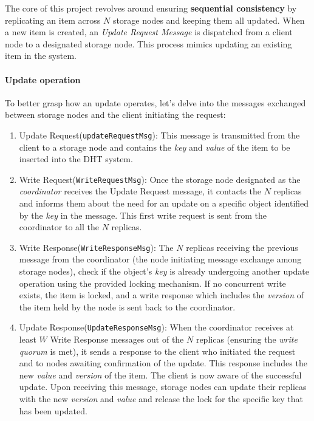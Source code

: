 \documentclass[a4paper, 11pt]{article}
\begin{document}
The core of this project revolves around ensuring \textbf{sequential consistency} by replicating an item across $N$ storage nodes and keeping them all updated. When a new item is created, an \textit{Update Request Message} is dispatched from a client node to a designated storage node. This process mimics updating an existing item in the system.

\paragraph{Update operation} To better grasp how an update operates, let's delve into the messages exchanged between storage nodes and the client initiating the request:

\begin{enumerate}
    \item Update Request(\verb|updateRequestMsg|): This message is transmitted from the client to a storage node and contains the \textit{key} and \textit{value} of the item to be inserted into the DHT system.

    \item Write Request(\verb|WriteRequestMsg|): Once the storage node designated as the \textit{coordinator} receives the Update Request message, it contacts the $N$ replicas and informs them about the need for an update on a specific object identified by the \textit{key} in the message. This first write request is sent from the coordinator to all the $N$ replicas.

    \item Write Response(\verb|WriteResponseMsg|): The $N$ replicas receiving the previous message from the coordinator (the node initiating message exchange among storage nodes), check if the object's \textit{key} is already undergoing another update operation using the provided locking mechanism. If no concurrent write exists, the item is locked, and a write response which includes the \textit{version} of the item held by the node is sent back to the coordinator.

    \item Update Response(\verb|UpdateResponseMsg|): When the coordinator receives at least $W$ Write Response messages out of the $N$ replicas (ensuring the \textit{write quorum} is met), it sends a response to the client who initiated the request and to nodes awaiting confirmation of the update. This response includes the new \textit{value} and \textit{version} of the item. The client is now aware of the successful update. Upon receiving this message, storage nodes can update their replicas with the new \textit{version} and \textit{value} and release the lock for the specific key that has been updated.
\end{enumerate}
\end{document}
